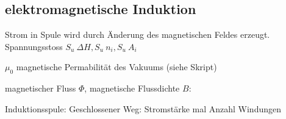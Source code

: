 \subsection*{elektromagnetische Induktion}
    Strom in Spule wird durch Änderung des magnetischen Feldes erzeugt.
    Spannungsstoss
    $ S_u ~ \Delta H, S_u ~ n_i, S_u ~ A_i$
    
    $\mu_0$ magnetische Permabilität des Vakuums (siehe Skript)

    magnetischer Fluss $\Phi$, magnetische Flussdichte $B$:

    Induktionsspule: 
    Geschlossener Weg:  Stromstärke mal Anzahl Windungen